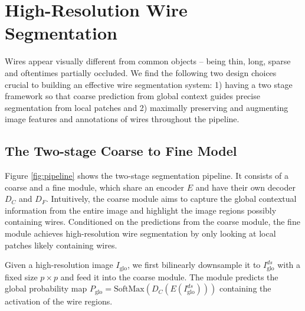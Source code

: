 



\section{High-Resolution Wire Segmentation}
\label{sec:segmentation}
Wires appear visually different from common objects -- being thin, long, sparse and oftentimes partially occluded. 
We find the following two design choices crucial to building an effective wire segmentation system: 1) having a two stage framework so that coarse prediction from global context guides precise segmentation from local patches and 2) maximally preserving and augmenting image features and annotations of wires throughout the pipeline.  

\subsection{The Two-stage Coarse to Fine Model}
Figure \ref{fig:pipeline} shows the two-stage segmentation pipeline. It consists of a coarse and a fine module, which share an encoder $E$ and have their own decoder $D_C$ and $D_F$. Intuitively, the coarse module aims to capture the global contextual information from the entire image and highlight the image regions possibly containing wires. Conditioned on the predictions from the coarse module, the fine module achieves high-resolution wire segmentation by only looking at local patches likely containing wires.

Given a high-resolution image $I_\textrm{glo}$, we first bilinearly downsample it to $I_\textrm{glo}^{ds}$ with a fixed size $p\times p$ and feed it into the coarse module. The module predicts the global probability map $P_\textrm{glo} = \textrm{SoftMax}(D_C(E(I_\textrm{glo}^{ds})))$ containing the activation of the wire regions.%

